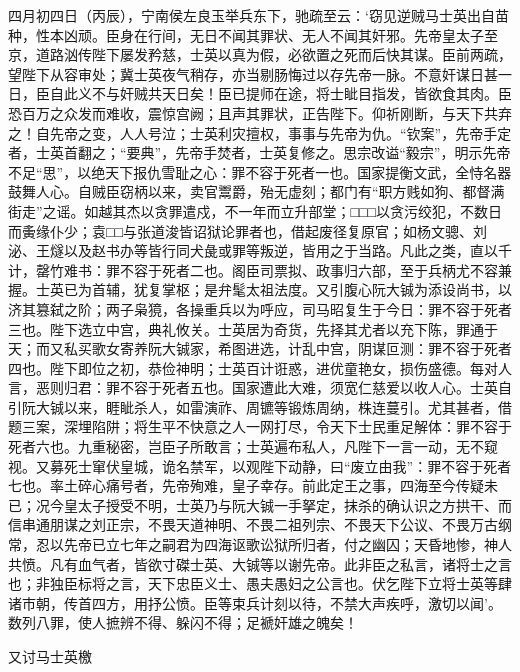 \documentclass[]{article}
\begin{document}
四月初四日（丙辰），宁南侯左良玉举兵东下，驰疏至云：`窃见逆贼马士英出自苗种，性本凶顽。臣身在行间，无日不闻其罪状、无人不闻其奸邪。先帝皇太子至京，道路汹传陛下屡发矜慈，士英以真为假，必欲置之死而后快其谋。臣前两疏，望陛下从容审处；冀士英夜气稍存，亦当剔肠悔过以存先帝一脉。不意奸谋日甚一日，臣自此义不与奸贼共天日矣！臣已提师在途，将士眦目指发，皆欲食其肉。臣恐百万之众发而难收，震惊宫阙；且声其罪状，正告陛下。仰祈刚断，与天下共弃之！自先帝之变，人人号泣；士英利灾擅权，事事与先帝为仇。``钦案''，先帝手定者，士英首翻之；``要典''，先帝手焚者，士英复修之。思宗改谥``毅宗''，明示先帝不足``思''，以绝天下报仇雪耻之心：罪不容于死者一也。国家提衡文武，全恃名器鼓舞人心。自贼臣窃柄以来，卖官鬻爵，殆无虚刻；都门有``职方贱如狗、都督满街走''之谣。如越其杰以贪罪遣戍，不一年而立升部堂；□□□以贪污绞犯，不数日而夤缘仆少；袁□□与张道浚皆诏狱论罪者也，借起废径复原官；如杨文骢、刘泌、王燧以及赵书办等皆行同犬彘或罪等叛逆，皆用之于当路。凡此之类，直以千计，罄竹难书：罪不容于死者二也。阁臣司票拟、政事归六部，至于兵柄尤不容兼握。士英已为首辅，犹复掌枢；是弁髦太祖法度。又引腹心阮大铖为添设尚书，以济其篡弑之阶；两子枭獍，各操重兵以为呼应，司马昭复生于今日：罪不容于死者三也。陛下选立中宫，典礼攸关。士英居为奇货，先择其尤者以充下陈，罪通于天；而又私买歌女寄养阮大铖家，希图进选，计乱中宫，阴谋叵测：罪不容于死者四也。陛下即位之初，恭俭神明；士英百计诳惑，进优童艳女，损伤盛德。每对人言，恶则归君：罪不容于死者五也。国家遭此大难，须宽仁慈爱以收人心。士英自引阮大铖以来，睚眦杀人，如雷演祚、周镳等锻炼周纳，株连蔓引。尤其甚者，借题三案，深埋陷阱；将生平不快意之人一网打尽，令天下士民重足解体：罪不容于死者六也。九重秘密，岂臣子所敢言；士英遍布私人，凡陛下一言一动，无不窥视。又募死士窜伏皇城，诡名禁军，以观陛下动静，曰``废立由我''：罪不容于死者七也。率土碎心痛号者，先帝殉难，皇子幸存。前此定王之事，四海至今传疑未已；况今皇太子授受不明，士英乃与阮大铖一手拏定，抹杀的确认识之方拱干、而信串通朋谋之刘正宗，不畏天道神明、不畏二祖列宗、不畏天下公议、不畏万古纲常，忍以先帝已立七年之嗣君为四海讴歌讼狱所归者，付之幽囚；天昏地惨，神人共愤。凡有血气者，皆欲寸磔士英、大铖等以谢先帝。此非臣之私言，诸将士之言也；非独臣标将之言，天下忠臣义士、愚夫愚妇之公言也。伏乞陛下立将士英等肆诸市朝，传首四方，用抒公愤。臣等束兵计刻以待，不禁大声疾呼，激切以闻'。
数列八罪，使人摭辨不得、躲闪不得；足褫奸雄之魄矣！

又讨马士英檄
\end{document}
